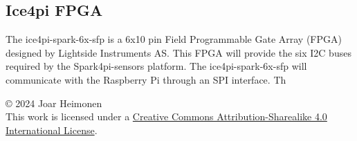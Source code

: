 \documentclass[12pt]{article}
\newcommand{\license}{
    \vspace{1em}
    \noindent\small{© 2024 Joar Heimonen\\
    This work is licensed under a \href{https://creativecommons.org/licenses/by-sa/4.0/}{Creative Commons Attribution-Sharealike 4.0 International License}.}
    \vspace{1em}
}
\begin{document}
\subsection{Ice4pi FPGA}
The ice4pi-spark-6x-sfp is a 6x10 pin Field Programmable Gate Array (FPGA) designed by Lightside Instruments AS.
This FPGA will provide the six I2C buses required by the Spark4pi-sensors platform. 
The ice4pi-spark-6x-sfp will communicate with the Raspberry Pi through an SPI interface.
Th


\pagebreak
{}
\printbibliography
\license
\end{document}
